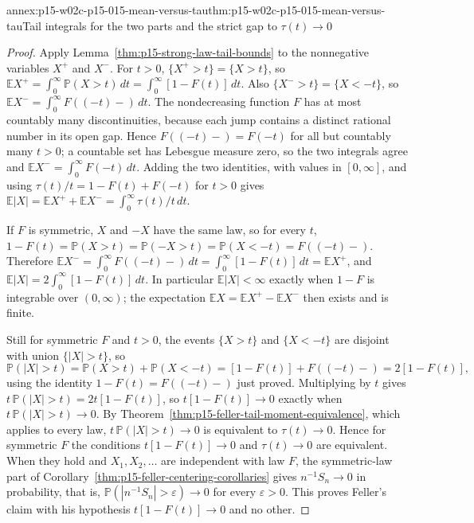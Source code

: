 \begin{annexitem}{annex:p15-w02c-p15-015-mean-versus-tau}{thm:p15-w02c-p15-015-mean-versus-tau}{Tail integrals for the two parts and the strict gap to \(\tau(t)\to0\)}
\begin{proof}
Apply Lemma~\ref{thm:p15-strong-law-tail-bounds} to the nonnegative
variables \(X^+\) and \(X^-\). For \(t>0\),
\(\{X^+>t\}=\{X>t\}\), so
\(\mathbb EX^+=\int_0^\infty\mathbb P(X>t)\,dt
=\int_0^\infty[1-F(t)]\,dt\). Also \(\{X^->t\}=\{X<-t\}\), so
\(\mathbb EX^-=\int_0^\infty F((-t)-)\,dt\). The nondecreasing function
\(F\) has at most countably many discontinuities, because each jump
contains a distinct rational number in its open gap. Hence
\(F((-t)-)=F(-t)\) for all but countably many \(t>0\); a countable set
has Lebesgue measure zero, so the two integrals agree and
\(\mathbb EX^-=\int_0^\infty F(-t)\,dt\). Adding the two identities,
with values in \([0,\infty]\), and using
\(\tau(t)/t=1-F(t)+F(-t)\) for \(t>0\) gives
\(\mathbb E|X|=\mathbb EX^++\mathbb EX^-=\int_0^\infty\tau(t)/t\,dt\).

If \(F\) is symmetric, \(X\) and \(-X\) have the same law, so for every
\(t\), \(1-F(t)=\mathbb P(X>t)=\mathbb P(-X>t)=\mathbb P(X<-t)=F((-t)-)\).
Therefore \(\mathbb EX^-=\int_0^\infty F((-t)-)\,dt
=\int_0^\infty[1-F(t)]\,dt=\mathbb EX^+\), and
\(\mathbb E|X|=2\int_0^\infty[1-F(t)]\,dt\). In particular
\(\mathbb E|X|<\infty\) exactly when \(1-F\) is integrable over
\((0,\infty)\); the expectation \(\mathbb EX=\mathbb EX^+-\mathbb EX^-\)
then exists and is finite.

Still for symmetric \(F\) and \(t>0\), the events \(\{X>t\}\) and
\(\{X<-t\}\) are disjoint with union \(\{|X|>t\}\), so
\[
 \mathbb P(|X|>t)=\mathbb P(X>t)+\mathbb P(X<-t)
 =[1-F(t)]+F((-t)-)=2[1-F(t)],
\]
using the identity \(1-F(t)=F((-t)-)\) just proved. Multiplying by
\(t\) gives \(t\,\mathbb P(|X|>t)=2t[1-F(t)]\), so
\(t[1-F(t)]\to0\) exactly when \(t\,\mathbb P(|X|>t)\to0\). By
Theorem~\ref{thm:p15-feller-tail-moment-equivalence}, which applies to
every law, \(t\,\mathbb P(|X|>t)\to0\) is equivalent to
\(\tau(t)\to0\). Hence for symmetric \(F\) the conditions
\(t[1-F(t)]\to0\) and \(\tau(t)\to0\) are equivalent. When they hold
and \(X_1,X_2,\ldots\) are independent with law \(F\), the
symmetric-law part of
Corollary~\ref{thm:p15-feller-centering-corollaries} gives
\(n^{-1}S_n\to0\) in probability, that is,
\(\mathbb P(|n^{-1}S_n|>\varepsilon)\to0\) for every
\(\varepsilon>0\). This proves Feller's claim with his hypothesis
\(t[1-F(t)]\to0\) and no other.


\end{proof}
\end{annexitem}
